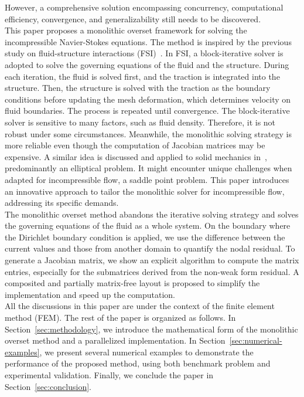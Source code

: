 \documentclass[preprint,12pt,sort&compress]{elsarticle}
\theoremstyle{definition}%
\begin{document}
However, a comprehensive solution encompassing concurrency, computational efficiency, convergence, and generalizability still needs to be discovered.\\
This paper proposes a monolithic overset framework for solving the incompressible Navier-Stokes equations.
The method is inspired by the previous study on fluid-structure interactions (FSI)~\cite{yan2016computational122,FSI1,FSI2,HsuBaz12a}.
In FSI, a block-iterative solver is adopted to solve the governing equations of the fluid and the structure.
During each iteration, the fluid is solved first, and the traction is integrated into the structure.
Then, the structure is solved with the traction as the boundary conditions before updating the mesh deformation, which determines velocity on fluid boundaries.
The process is repeated until convergence.
The block-iterative solver is sensitive to many factors, such as fluid density.
Therefore, it is not robust under some circumstances.
Meanwhile, the monolithic solving strategy is more reliable even though the computation of Jacobian matrices may be expensive.
A similar idea is discussed and applied to solid mechanics in~\cite{mota2017schwarz}, predominantly an elliptical problem. It might encounter unique challenges when adapted for incompressible flow, a saddle point problem.
This paper introduces an innovative approach to tailor the monolithic solver for incompressible flow, addressing its specific demands.\\
The monolithic overset method abandons the iterative solving strategy and solves the governing equations of the fluid as a whole system.
On the boundary where the Dirichlet boundary condition is applied, we use the difference between the current values and those from another domain to quantify the nodal residual.
To generate a Jacobian matrix, we show an explicit algorithm to compute the matrix entries, especially for the submatrices derived from the non-weak form residual.
A composited and partially matrix-free layout is proposed to simplify the implementation and speed up the computation.\\
All the discussions in this paper are under the context of the finite element method (FEM).
The rest of the paper is organized as follows.
In Section~\ref{sec:methodology}, we introduce the mathematical form of the monolithic overset method and a parallelized implementation.
In Section~\ref{sec:numerical-examples}, we present several numerical examples to demonstrate the performance of the proposed method, using both benchmark problem and experimental validation.
Finally, we conclude the paper in Section~\ref{sec:conclusion}.
\end{document}
